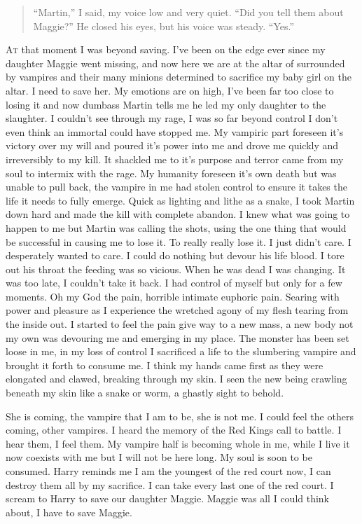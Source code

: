 
\begin{quote}
	``Martin,” I said, my voice low and very quiet. “Did you tell them about Maggie?”
	He closed his eyes, but his voice was steady. “Yes.”
\end{quote}

\lettrine[lines=2,lraise=0]{A}t that moment I was beyond saving. I've been on the edge ever since my daughter Maggie went missing, and now here we are at the altar of \chichenitza\: surrounded by vampires and their many minions determined to sacrifice my baby girl on the altar. I need to save her. 
My emotions are on high, I've been far too close to losing it and now dumbass Martin tells me he led my only daughter to the slaughter. I couldn't see through my rage, I was so far beyond control I don't even think an immortal could have stopped me. My vampiric part foreseen it's victory over my will and poured it's power into me and drove me quickly and irreversibly to my kill. It shackled me to it's purpose and terror came from my soul to intermix with the rage. My humanity foreseen it's own death but was unable to pull back, the vampire in me had stolen control to ensure it takes the life it needs to fully emerge. Quick as lighting and lithe as a snake, I took Martin down hard and made the kill with complete abandon. 
I knew what was going to happen to me but Martin was calling the shots, using the one thing that would be successful in causing me to lose it. To really really lose it. I just didn't care. I desperately wanted to care. I could do nothing but devour his life blood. I tore out his throat the feeding was so vicious. When he was dead I was changing. It was too late, I couldn't take it back. I had control of myself but only for a few moments. Oh my God the pain, horrible intimate euphoric pain. Searing with power and pleasure as I experience the wretched agony of my flesh tearing from the inside out. I started to feel the pain give way to a new mass, a new body not my own was devouring me and emerging in my place. The monster has been set loose in me, in my loss of control I sacrificed a life to the slumbering vampire and brought it forth to consume me. I think my hands came first as they were elongated and clawed, breaking through my skin. I seen the new being crawling beneath my skin like a snake or worm, a ghastly sight to behold.

She is coming, the vampire that I am to be, she is not me. I could feel the others coming, other vampires. I heard the memory of the Red Kings call to battle. I hear them, I feel them. My vampire half is becoming whole in me, while I live it now coexists with me but I will not be here long. My soul is soon to be consumed. Harry reminds me I am the youngest of the red court now, I can destroy them all by my sacrifice. I can take every last one of the red court. I scream to Harry to save our daughter Maggie. Maggie was all I could think about, I have to save Maggie.

